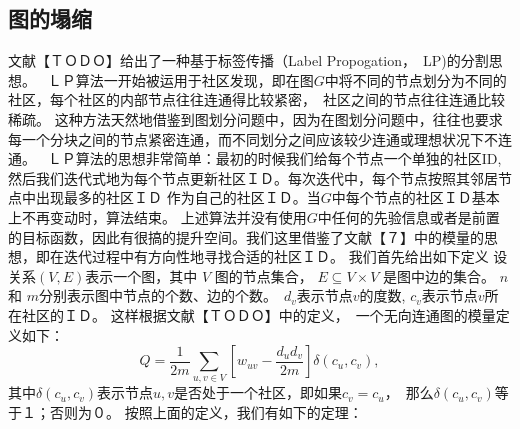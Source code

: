 \documentclass[master]{njuthesis}
\begin{document}
\subsection{图的塌缩}
文献【ＴＯＤＯ】给出了一种基于标签传播（Label Propogation，　LP)的分割思想。　
ＬＰ算法一开始被运用于社区发现，即在图$G$中将不同的节点划分为不同的社区，每个社区的内部节点往往连通得比较紧密，　社区之间的节点往往连通比较稀疏。
这种方法天然地借鉴到图划分问题中，因为在图划分问题中，往往也要求每一个分块之间的节点紧密连通，而不同划分之间应该较少连通或理想状况下不连通。　
ＬＰ算法的思想非常简单：最初的时候我们给每个节点一个单独的社区ID, 然后我们迭代式地为每个节点更新社区ＩＤ。每次迭代中，每个节点按照其邻居节点中出现最多的社区ＩＤ
作为自己的社区ＩＤ。当$G$中每个节点的社区ＩＤ基本上不再变动时，算法结束。
上述算法并没有使用$G$中任何的先验信息或者是前置的目标函数，因此有很搞的提升空间。我们这里借鉴了文献【７】中的模量的思想，即在迭代过程中有方向性地寻找合适的社区ＩＤ。
我们首先给出如下定义
设关系$(V, E)$表示一个图，其中 $V$ 图的节点集合， $E \subseteq V \times V$ 是图中边的集合。
$n$ 和 $m$分别表示图中节点的个数、边的个数。　$d_v$表示节点$v$的度数, $c_v$表示节点$v$所在社区的ＩＤ。
这样根据文献【ＴＯＤＯ】中的定义，　一个无向连通图的模量定义如下：
\begin{equation}\label{eq:modularity}
Q = \frac{1}{2m}\sum\limits_{u, v \in V} \left[w_{uv} - \frac{{d_u}{d_v}}{2m} \right]\delta(c_u, c_v),
\end{equation}
其中$\delta(c_u, c_v)$表示节点$u, v$是否处于一个社区，即如果$c_v = c_u$，　那么$\delta(c_u, c_v)$等于１；否则为０。
按照上面的定义，我们有如下的定理：
\end{document}
